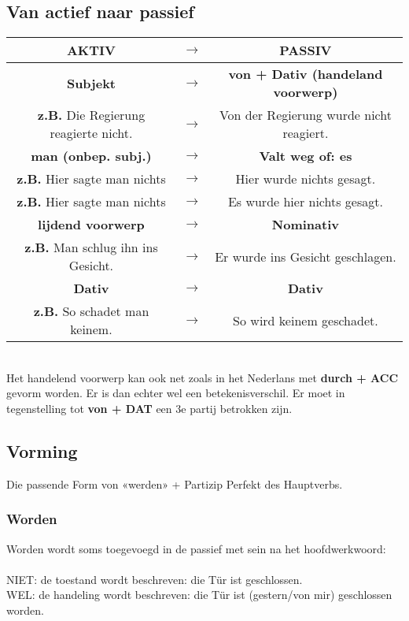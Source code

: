 \documentclass[main.tex]{subfiles}
\begin{document}
\subsection{Van actief naar passief}
\begin{tabular}{c c c}

\textbf{AKTIV} & $\rightarrow$ & \textbf{PASSIV} \\ 
\hline
\textbf{Subjekt} & $\rightarrow$ & \textbf{von + Dativ (handeland voorwerp)}\\ 
\textbf{z.B.} Die Regierung reagierte nicht. & $\rightarrow$ & Von der Regierung wurde nicht reagiert. \\ 
\hline
\textbf{man (onbep. subj.)} & $\rightarrow$ & \textbf{Valt weg of: es} \\ 
\textbf{z.B.} Hier sagte man nichts & $\rightarrow$ & Hier wurde nichts gesagt. \\ 
\textbf{z.B.} Hier sagte man nichts & $\rightarrow$ & Es wurde hier nichts gesagt. \\ 
\hline
\textbf{lijdend voorwerp} & $\rightarrow$ & \textbf{Nominativ} \\ 

\textbf{z.B.} Man schlug ihn ins Gesicht. & $\rightarrow$ & Er wurde ins Gesicht geschlagen. \\ 
\hline
\textbf{Dativ} & $\rightarrow$ & \textbf{Dativ} \\ 

\textbf{z.B.} So schadet man keinem. & $\rightarrow$ & So wird keinem geschadet. \\ 

\end{tabular}
\\
Het handelend voorwerp kan ook net zoals in het Nederlans met \textbf{durch + ACC} gevorm worden. Er is dan echter wel een betekenisverschil. Er moet in tegenstelling tot \textbf{von + DAT} een 3e partij betrokken zijn.

\subsection{Vorming}
Die passende Form von «werden» + Partizip Perfekt des Hauptverbs.
\subsubsection{Worden}
Worden wordt soms toegevoegd in de passief met sein na het hoofdwerkwoord:\\
\\
NIET: de toestand wordt beschreven: die Tür ist geschlossen.\\
WEL: de handeling wordt beschreven: die Tür ist (gestern/von mir) geschlossen worden.
\end{document}
